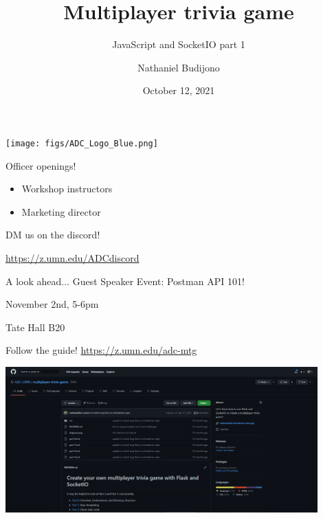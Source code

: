 \documentclass{beamer}
\title{Multiplayer trivia game}
\subtitle{JavaScript and SocketIO part 1}
\author{Nathaniel Budijono}
\date{October 12, 2021}
\institute{UMN ADC}
\begin{document}
\begin{frame}
    \titlepage
    \texttt{[image: figs/ADC\_Logo\_Blue.png]}
\end{frame}

\begin{frame}{Officer openings!}
	\begin{itemize}
		\item Workshop instructors
		\item Marketing director
	\end{itemize}

	\bigskip

	DM us on the discord!

	\bigskip

	\href{https://z.umn.edu/ADCdiscord}{https://z.umn.edu/ADCdiscord}
\end{frame}

\begin{frame}{A look ahead...}
	\centering
	{\Huge Guest Speaker Event: Postman API 101!}

	\bigskip

	November 2nd, 5-6pm

	\bigskip

	Tate Hall B20
\end{frame}

\begin{frame}{Follow the guide!}
	\centering
	\href{https://z.umn.edu/adc-mtg}{https://z.umn.edu/adc-mtg}

	\bigskip

	\includegraphics[width=0.9\textwidth]{figs/guide.png}
\end{frame}
\end{document}
